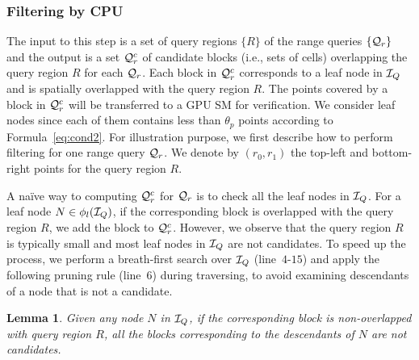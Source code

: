 \documentclass[10pt,conference,letterpaper]{IEEEtran}
\newcommand{\rangeq}{{{\cal Q}_r}\xspace}
\newcommand{\rangecand}{{{\cal Q}_r^c}\xspace}
\newcommand{\treeindex}{{{\cal I}_Q}\xspace}
\newtheorem{lemma}{Lemma}
\begin{document}
%

\subsubsection{Filtering by CPU}

The input to this step is a set of query regions $\{R\}$ of the range queries $\{\rangeq\}$ and the output is a set $\rangecand$ of candidate blocks (i.e., sets of cells) overlapping the query region $R$ for each  $\rangeq$. Each block in $\rangecand$ corresponds to a leaf node in $\treeindex$ and is spatially overlapped with the query region $R$. The points covered by a block in $\rangecand$ will be transferred to a GPU SM for verification. We consider leaf nodes since each of them contains less than $\theta_p$ points according to Formula~\ref{eq:cond2}.
For illustration purpose, we first describe how to perform filtering for one range query $\rangeq$.
We denote by $(r_0, r_1)$ the top-left and bottom-right points for the query region $R$.

A na\"ive way to computing $\rangecand$ for $\rangeq$ is to check all the leaf nodes in $\treeindex$. For a leaf node $N\in\phi_l(\treeindex)$, if the corresponding block is overlapped with the query region $R$, we add the block to $\rangecand$.
However, we observe that the query region $R$ is typically small and most leaf nodes in $\treeindex$ are not candidates.
To speed up the process, we perform a breath-first search over $\treeindex$ (line~$4$-$15$) and apply the following pruning rule (line~$6$) during traversing, to avoid examining descendants of a node that is not a candidate.
%
\begin{lemma}\label{le:rangeprune}
	Given any node $N$ in $\treeindex$, if the corresponding block is non-overlapped with query region $R$, all the blocks corresponding to the descendants of $N$ are not candidates.
\end{lemma}

\end{document}
